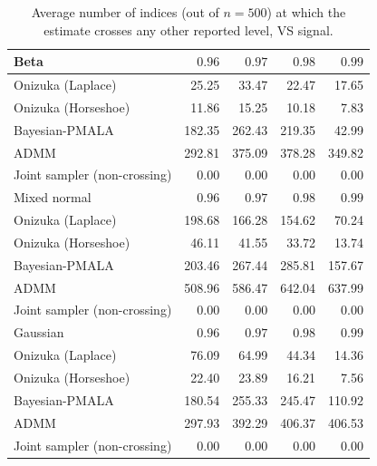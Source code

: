\begin{table}[!htbp]
\centering
\small
\caption{Average number of indices (out of $n=500$) at which the estimate crosses any other reported level, VS signal.}
\label{tab:ext_vs_crossings_all}
\begin{tabular}{lrrrr}
\toprule
Beta & $0.96$ & $0.97$ & $0.98$ & $0.99$ \\
\midrule
Onizuka (Laplace) & 25.25 & 33.47 & 22.47 & 17.65 \\
Onizuka (Horseshoe) & 11.86 & 15.25 & 10.18 & 7.83 \\
Bayesian-PMALA & 182.35 & 262.43 & 219.35 & 42.99 \\
ADMM & 292.81 & 375.09 & 378.28 & 349.82 \\
Joint sampler (non-crossing) & 0.00 & 0.00 & 0.00 & 0.00 \\
\midrule
Mixed normal & $0.96$ & $0.97$ & $0.98$ & $0.99$ \\
\midrule
Onizuka (Laplace) & 198.68 & 166.28 & 154.62 & 70.24 \\
Onizuka (Horseshoe) & 46.11 & 41.55 & 33.72 & 13.74 \\
Bayesian-PMALA & 203.46 & 267.44 & 285.81 & 157.67 \\
ADMM & 508.96 & 586.47 & 642.04 & 637.99 \\
Joint sampler (non-crossing) & 0.00 & 0.00 & 0.00 & 0.00 \\
\midrule
Gaussian & $0.96$ & $0.97$ & $0.98$ & $0.99$ \\
\midrule
Onizuka (Laplace) & 76.09 & 64.99 & 44.34 & 14.36 \\
Onizuka (Horseshoe) & 22.40 & 23.89 & 16.21 & 7.56 \\
Bayesian-PMALA & 180.54 & 255.33 & 245.47 & 110.92 \\
ADMM & 297.93 & 392.29 & 406.37 & 406.53 \\
Joint sampler (non-crossing) & 0.00 & 0.00 & 0.00 & 0.00 \\
\bottomrule
\end{tabular}
\end{table}
